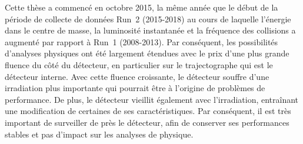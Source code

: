




Cette thèse a commencé en octobre 2015, la même année que le début de la période de collecte de données Run~2 (2015-2018) au cours de laquelle l’énergie dans le centre de masse, la luminosité instantanée et la fréquence des collisions a augmenté par rapport à Run~1 (2008-2013). Par conséquent, les possibilités d'analyses physiques ont été largement étendues avec le prix d'une plus grande fluence du côté du détecteur, en particulier sur le trajectographe qui est le détecteur interne. Avec cette fluence croissante, le détecteur souffre d’une irradiation plus importante qui pourrait être à l’origine de problèmes de performance. De plus, le détecteur vieillit également avec l'irradiation, entraînant une modification de certaines de ses caractéristiques. Par conséquent, il est très important de surveiller de près le détecteur, afin de conserver ses performances stables et pas d'impact sur les analyses de physique.

